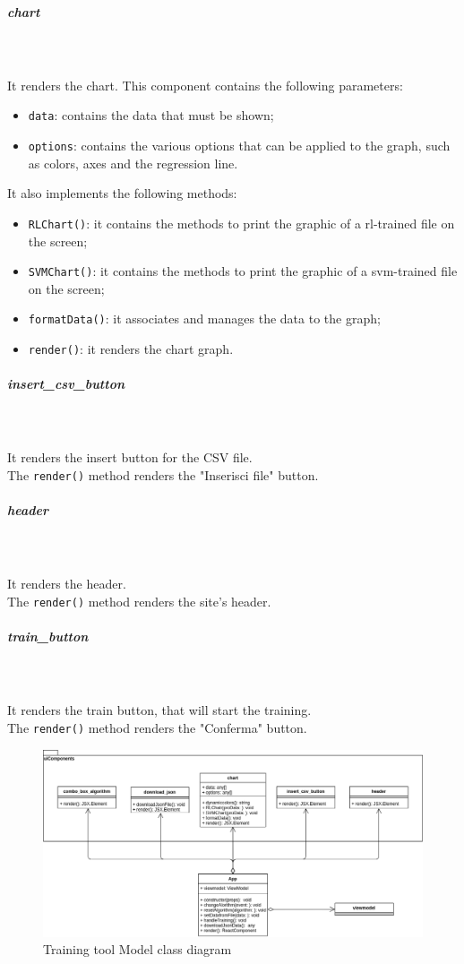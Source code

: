 \subparagraph*{chart}\mbox{} \\ \mbox{} \\
It renders the chart.
This component contains the following parameters: 
\begin{itemize}
\item \texttt{data}: contains the data that must be shown;
\item \texttt{options}: contains the various options that can be applied to the graph, such as colors, axes and the regression line.
\end{itemize}
It also implements the following methods: 
\begin{itemize}
\item \texttt{RLChart()}: it contains the methods to print the graphic of a rl-trained file on the screen; 
\item \texttt{SVMChart()}: it contains the methods to print the graphic of a svm-trained file on the screen;
\item \texttt{formatData()}: it associates and manages the data to the graph;
\item \texttt{render()}: it renders the chart graph.

\end{itemize}

\subparagraph*{insert\_csv\_button}\mbox{} \\ \mbox{} \\
It renders the insert button for the CSV file.\\
The \texttt{render()} method renders the "Inserisci file" button.

\subparagraph*{header}\mbox{} \\ \mbox{} \\
It renders the header.\\
The \texttt{render()} method renders the site's header.

\subparagraph*{train\_button}\mbox{} \\ \mbox{} \\
It renders the train button, that will start the training.\\
The \texttt{render()} method renders the "Conferma" button.

\begin{figure}[H]
\centering
\includegraphics[scale=0.45]{../../../Diagrams/Classes_diagrams/tool_view.png}
\caption{Training tool Model class diagram}
\end{figure}

